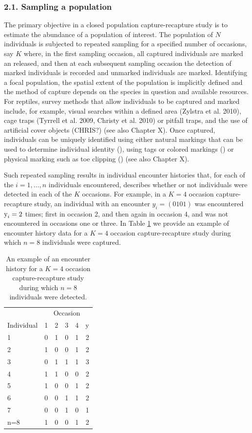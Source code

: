 \documentclass{book}
\begin{document}
\subsubsection*{2.1. Sampling a population}

The primary objective in a closed population capture-recapture study
is to estimate the abundance of a population of interest. The
population of $N$ individuals is subjected to repeated sampling for a
specified number of occasions, say $K$ where, in the first sampling
occasion, all captured individuals are marked an released, and then at
each subsequent sampling occasion the detection of marked individuals
is recorded and unmarked individuals are marked. Identifying a focal
population, the spatial extent of the population is implicitly defined
and the method of capture depends on the species in question and
available resources. For reptiles, survey methods that allow
individuals to be captured and marked include, for example, visual
searches within a defined area (Zylstra et al. 2010), cage traps
(Tyrrell et al. 2009, Christy et al. 2010) or pitfall traps, and the
use of artificial cover objects (CHRIS?) (see also Chapter X). Once
captured, individuals can be uniquely identified using either natural
markings that can be used to determine individual identity (), using
tags or colored markings () or physical marking such as toe clipping
() (see also Chapter X).

Such repeated sampling results in individual encounter histories that,
for each of the $i=1,\ldots,n$ individuals encountered, describes
whether or not individuals were detected in each of the $K$
occasions. For example, in a $K = 4$ occasion capture-recapture study,
an individual with an encounter $y_i = (0 1 0 1)$ was encountered
$\hbox{y}_i = 2$ times; first in occasion 2, and then again in
occasion 4, and was not encountered in occasions one or three. In
Table \ref{enchist} we provide an example of encounter history data
for a $K=4$ occasion capture-recapture study during which $n=8$
individuals were captured.

\begin{table}[h]
  \centering
  \caption{An example of an encounter history for a $K = 4$ occasion capture-recapture study during which $n=8$ individuals were detected.}
  \label{enchist}
 \begin{tabular}{lccccr}
 \hline
    &\multicolumn{5}{c}{Occasion} \\
  Individual & 1 & 2 & 3 & 4 & y\\
 \hline
  1   & 0 & 1 & 0 & 1 & 2 \\
  2   & 1 & 0 & 0 & 1 & 2 \\
  3   & 0 & 1 & 1 & 1 & 3 \\
  4   & 1 & 1 & 0 & 0 & 2 \\
  5   & 1 & 0 & 0 & 1 & 2 \\
  6   & 0 & 0 & 1 & 1 & 2 \\
  7   & 0 & 0 & 1 & 0 & 1 \\
  n=8 & 1 & 0 & 0 & 1 & 2 \\
 \hline
 \end{tabular}
\end{table}
\end{document}
